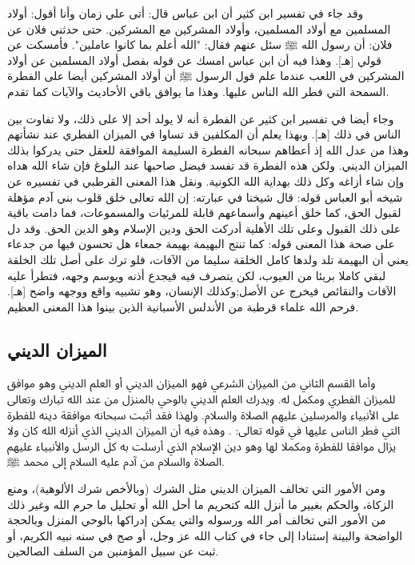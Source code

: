 وقد جاء في تفسير ابن كثير أن ابن عباس قال: 
أتى علي زمان وأنا أقول: أولاد المسلمين مع أولاد المسلمين، وأولاد المشركين مع المشركين. حتى حدثني فلان عن فلان: أن رسول الله ﷺ سئل عنهم فقال: "الله أعلم بما كانوا عاملين". فأمسكت عن قولي [هـ]. وهذا فيه أن ابن عباس امسك عن قوله بفصل أولاد المسلمين عن أولاد المشركين في اللعب عندما علم قول الرسول ﷺ أن أولاد المشركين أيضا على الفطرة السمحة التي فطر الله الناس عليها. وهذا ما يوافق باقي الأحاديث والآيات كما تقدم. 

وجاء أيضا في تفسير ابن كثير عن الفطرة أنه لا يولد أحد إلا على ذلك، ولا تفاوت بين الناس في ذلك [هـ]. وبهذا يعلم أن المكلفين قد تساوا في الميزان الفطري عند نشأتهم وهذا من عدل الله إذ أعطاهم سبحانه الفطرة السليمة الموافقة للعقل حتى يدركوا بذلك الميزان الديني. ولكن هذه الفطرة قد تفسد فيضل صاحبها عند البلوغ فإن شاء الله هداه وإن شاء أزاغه وكل ذلك بهداية الله الكونية. ونقل هذا المعنى القرطبي في تفسيره عن شيخه أبو العباس قوله: قال شيخنا في عبارته: إن الله تعالى خلق قلوب بني آدم مؤهلة لقبول الحق، كما خلق أعينهم وأسماعهم قابلة للمرئيات والمسموعات، فما دامت باقية على ذلك القبول وعلى تلك الأهلية أدركت الحق ودين الإسلام وهو الدين الحق. وقد دل على صحة هذا المعنى قوله: كما تنتج البهيمة بهيمة جمعاء هل تحسون فيها من جدعاء يعني أن البهيمة تلد ولدها كامل الخلقة سليما من الآفات، فلو ترك على أصل تلك الخلقة لبقي كاملا بريئا من العيوب، لكن يتصرف فيه فيجدع أذنه ويوسم وجهه، فتطرأ عليه الآفات والنقائص فيخرج عن الأصل;وكذلك الإنسان، وهو تشبيه واقع ووجهه واضح [هـ]. فرحم الله علماء قرطبة من الأندلس الأسبانية الذين بينوا هذا المعنى العظيم.

\subsection{الميزان الديني}

وأما القسم الثاني من الميزان الشرعي فهو الميزان الديني أو العلم الديني وهو موافق للميزان الفطري ومكمل له. ويدرك العلم الديني بالوحي بالمنزل من عند الله تبارك وتعالى على الأنبياء والمرسلين عليهم الصلاة والسلام. ولهذا فقد أثبت سبحانه موافقة دينه للفطرة التي فطر الناس عليها في قوله تعالى: 
\quranayah*[30][30]{\footnotesize \surahname*[30]}. وهذه فيه أن الميزان الديني الذي أنزله الله كان ولا يزال موافقا للفطرة ومكملا لها وهو دين الإسلام الذي أرسلت به كل الرسل والأنبياء عليهم الصلاة والسلام من آدم عليه السلام إلى محمد ﷺ.

ومن الأمور التي تخالف الميزان الديني مثل الشرك (وبالأخص شرك الألوهية)، ومنع الزكاة، والحكم بغيير ما أنزل الله كتحريم ما أحل الله أو تحليل ما حرم الله وغير ذلك من الأمور التي تخالف أمر الله ورسوله والتي يمكن إدراكها بالوحي المنزل وبالحجة الواضحة والبينة إستنادا إلى جاء في كتاب الله عز وجل، أو صح في سنه نبيه الكريم، أو ثبت عن سبيل المؤمنين من السلف الصالحين. 

